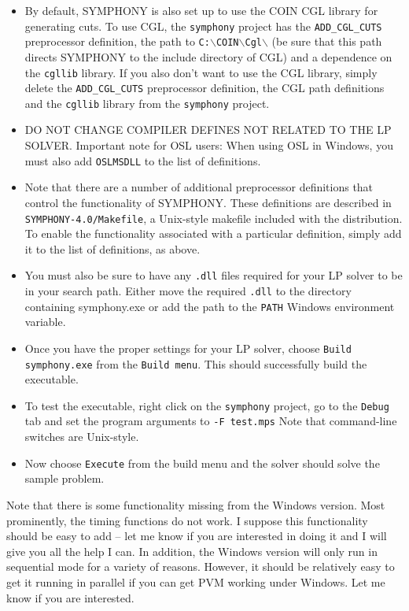 \begin{itemize}
\item By default, SYMPHONY is also set up to use the COIN CGL library for
generating cuts. To use CGL, the \texttt{symphony} project has the
\texttt{ADD\_CGL\_CUTS} preprocessor definition, the path to
\texttt{C:$\backslash$COIN$\backslash$Cgl$\backslash$} (be sure that this path
directs SYMPHONY to the include directory of CGL) and a dependence on the
\texttt{cgllib} library. If you also don't want to use the CGL library, simply
delete the \texttt{ADD\_CGL\_CUTS} preprocessor definition, the CGL path
definitions and the \texttt{cgllib} library from the \texttt{symphony}
project.

\item DO NOT CHANGE COMPILER DEFINES NOT RELATED TO THE LP SOLVER. Important note
for OSL users: When using OSL in Windows, you must also add \texttt{OSLMSDLL}
to the list of definitions.

\item Note that there are a number of additional preprocessor definitions that
control the functionality of SYMPHONY. These definitions are described in
\texttt{SYMPHONY-4.0/Makefile}, a Unix-style makefile included with the
distribution. To enable the functionality associated with a particular
definition, simply add it to the list of definitions, as above.

\item You must also be sure to have any \texttt{.dll} files required for your
LP solver to be in your search path. Either move the required \texttt{.dll} to
the directory containing symphony.exe or add the path to the \texttt{PATH}
Windows environment variable.

\item Once you have the proper settings for your LP solver, choose \texttt{Build
symphony.exe} from the \texttt{Build menu}. This should successfully build
the executable.

\item To test the executable, right click on the \texttt{symphony} project, go
to the \texttt{Debug} tab and set the program arguments to \texttt{-F
test.mps} Note that command-line switches are Unix-style.

\item Now choose \texttt{Execute} from the build menu and the solver
should solve the sample problem.

\end{itemize}

Note that there is some functionality missing from the Windows version. Most
prominently, the timing functions do not work. I suppose this functionality
should be easy to add -- let me know if you are interested in doing it and I
will give you all the help I can. In addition, the Windows version will only
run in sequential mode for a variety of reasons. However, it should be
relatively easy to get it running in parallel if you can get PVM working under
Windows. Let me know if you are interested.

